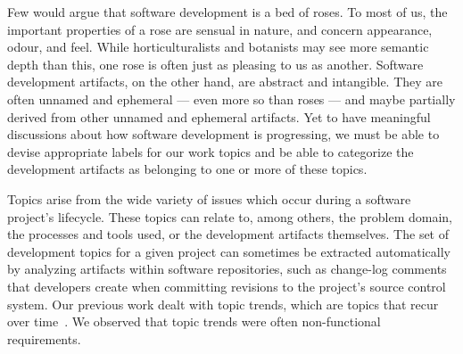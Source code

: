 \documentclass{acm_proc_article-sp}
\begin{document}
Few would argue that software development is a bed of roses.  To most of us, the important properties of a rose are sensual in nature, and concern appearance, odour, and feel.  While horticulturalists and botanists may see more semantic depth than this, one rose is often just as pleasing to us as another.  Software development artifacts, on the other hand, are abstract and intangible.  They are often unnamed and ephemeral --- even more so than roses --- and maybe partially derived from other unnamed and ephemeral artifacts.  Yet to have meaningful discussions about how software development is progressing, we must be able to devise appropriate labels for our work topics and be able to categorize the development artifacts as belonging to one or more of these topics. 




Topics arise from the wide variety of issues which occur during a software project's lifecycle. These topics can relate to, among others, the problem domain, the processes and tools used, or the development artifacts themselves.  The set of development topics for a given project can sometimes be extracted automatically by analyzing artifacts within software repositories, such as change-log comments that developers create when committing revisions to the project's source control system.  Our previous work dealt with topic trends, which are topics that recur over time~\cite{Hindle09ICSM}. We observed that topic trends were often non-functional requirements.



\end{document}
